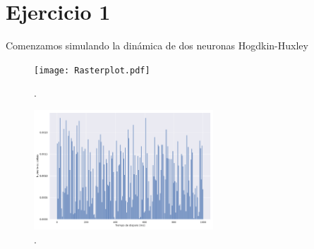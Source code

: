 \section*{Ejercicio 1}
\graphicspath{{Figuras/}}

Comenzamos simulando la dinámica de dos neuronas Hogdkin-Huxley \cite{HH}

\begin{figure}[h!]
    \centering
    \texttt{[image: Rasterplot.pdf]}
    \caption{.}
    \label{ej01:Rasterplot}
\end{figure}

\begin{figure}[h!]
    \centering
    \includegraphics[width=0.6\textwidth]{3_rt.pdf}
    \caption{.}
    \label{ej03:r(t)}
\end{figure}